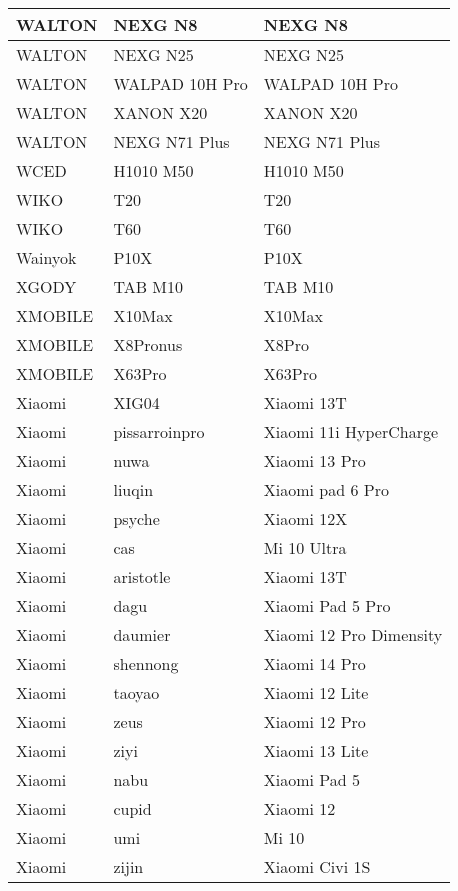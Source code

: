 \begin{tabularx}{\linewidth}{|l|X|X|}
        WALTON & NEXG N8 & NEXG N8 \\ \hline
        WALTON & NEXG N25 & NEXG N25 \\ \hline
        WALTON & WALPAD 10H Pro & WALPAD 10H Pro \\ \hline
        WALTON & XANON X20 & XANON X20 \\ \hline
        WALTON & NEXG N71 Plus & NEXG N71 Plus \\ \hline
        WCED & H1010 M50 & H1010 M50 \\ \hline
        WIKO & T20 & T20 \\ \hline
        WIKO & T60 & T60 \\ \hline
        Wainyok & P10X & P10X \\ \hline
        XGODY & TAB M10 & TAB M10 \\ \hline
        XMOBILE & X10Max & X10Max \\ \hline
        XMOBILE & X8Pronus & X8Pro \\ \hline
        XMOBILE & X63Pro & X63Pro \\ \hline
        Xiaomi & XIG04 & Xiaomi 13T \\ \hline
        Xiaomi & pissarroinpro & Xiaomi 11i HyperCharge \\ \hline
        Xiaomi & nuwa & Xiaomi 13 Pro \\ \hline
        Xiaomi & liuqin & Xiaomi pad 6 Pro \\ \hline
        Xiaomi & psyche & Xiaomi 12X \\ \hline
        Xiaomi & cas & Mi 10 Ultra \\ \hline
        Xiaomi & aristotle & Xiaomi 13T \\ \hline
        Xiaomi & dagu & Xiaomi Pad 5 Pro \\ \hline
        Xiaomi & daumier & Xiaomi 12 Pro Dimensity \\ \hline
        Xiaomi & shennong & Xiaomi 14 Pro \\ \hline
        Xiaomi & taoyao & Xiaomi 12 Lite \\ \hline
        Xiaomi & zeus & Xiaomi 12 Pro \\ \hline
        Xiaomi & ziyi & Xiaomi 13 Lite \\ \hline
        Xiaomi & nabu & Xiaomi Pad 5 \\ \hline
        Xiaomi & cupid & Xiaomi 12 \\ \hline
        Xiaomi & umi & Mi 10 \\ \hline
        Xiaomi & zijin & Xiaomi Civi 1S \\ \hline

\end{tabularx}
